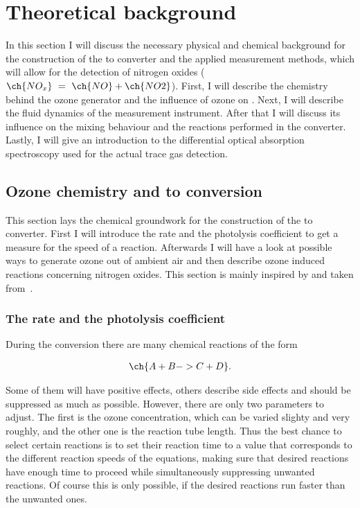 \section{Theoretical background}
\label{sec:theory}

In this section I will discuss the necessary physical and chemical
background for the construction of the  to  converter
and the applied measurement methods, which will allow for the
detection of nitrogen oxides ($\ch{NO_x}\ =\ \ch{NO} +
\ch{NO2}$). First, I will describe the chemistry behind the ozone
generator and the influence of ozone on . Next, I will
describe the fluid dynamics of the measurement instrument. After that
I will discuss its influence on the mixing behaviour and the reactions
performed in the converter. Lastly, I will give an introduction to the
differential optical absorption spectroscopy used for the actual trace
gas detection.

\subsection{Ozone chemistry and  to  conversion}
\label{sec:chemistry}

This section lays the chemical groundwork for the construction of the
 to  converter. First I will introduce the rate and the
photolysis coefficient to get a measure for the speed of a
reaction. Afterwards I will have a look at possible ways to generate
ozone out of ambient air and then describe ozone induced reactions
concerning nitrogen oxides. This section is mainly inspired by and
taken from~\cite{bsc}.

\subsubsection{The rate and the photolysis coefficient}
\label{sec:rate}

During the conversion there are many chemical reactions of the form

\begin{align}
  \ch{A + B -> C + D}. \label{eq:prototype}
\end{align}

Some of them will have positive effects, others describe side effects
and should be suppressed as much as possible. However, there
are only two parameters to adjust. The first is the ozone
concentration, which can be varied slighty and very roughly, and the
other one is the reaction tube length. Thus the best chance to select
certain reactions is to set their reaction time to a value that
corresponds to the different reaction speeds of the equations, making
sure that desired reactions have enough time to proceed while
simultaneously suppressing unwanted reactions. Of course this is only
possible, if the desired reactions run faster than the unwanted ones.

